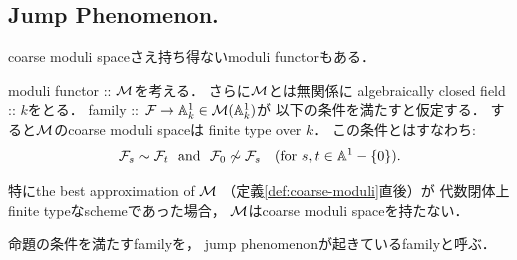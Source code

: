 \documentclass[a4paper]{jsarticle}
\begin{document}
    \subsection{Jump Phenomenon.}
    coarse moduli spaceさえ持ち得ないmoduli functorもある．

    \begin{Prop}
        moduli functor :: $\mathcal{M}$を考える．
        さらに$\mathcal{M}$とは無関係に
        algebraically closed field :: $k$をとる．
        family :: $\mathcal{F} \to \mathbb{A}_k^1 \in \mathcal{M}(\mathbb{A}_k^1)$が
        以下の条件を満たすと仮定する．
        すると$\mathcal{M}$のcoarse moduli spaceは
        finite type over $k$．
        この条件とはすなわち:
        \[
            \famF_{s} \sim \famF_{t}
            \ \mand\ 
            \famF_{0} \not \sim \famF_{s} \quad (\mfor s,t \in \affine^1-\{0\}).
        \]
        
        特にthe best approximation of $\mathcal{M}$ 
        （定義\ref{def:coarse-moduli}直後）が
        代数閉体上finite typeなschemeであった場合，
        $\mathcal{M}$はcoarse moduli spaceを持たない．
    \end{Prop}
    命題の条件を満たすfamilyを，
    jump phenomenonが起きているfamilyと呼ぶ．
\end{document}
